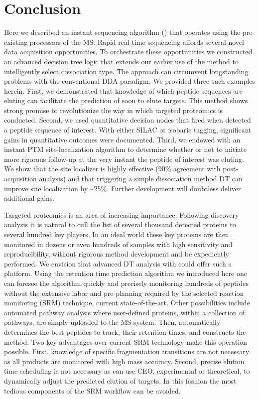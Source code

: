 \section{Conclusion}

Here we described an instant sequencing algorithm (\inseq{}) that operates using the pre-existing processors of the MS. Rapid real-time sequencing affords several novel data acquisition opportunities. To orchestrate these opportunities we constructed an advanced decision tree logic that extends our earlier use of the method to intelligently select dissociation type. The approach can circumvent longstanding problems with the conventional DDA paradigm. We provided three such examples herein. First, we demonstrated that knowledge of which peptide sequences are eluting can facilitate the prediction of soon to elute targets. This method shows strong promise to revolutionize the way in which targeted proteomics is conducted. Second, we used quantitative decision nodes that fired when \inseq{} detected a peptide sequence of interest. With either SILAC or isobaric tagging, significant gains in quantitative outcomes were documented. Third, we endowed \inseq{} with an instant PTM site-localization algorithm to determine whether or not to initiate more rigorous follow-up at the very instant the peptide of interest was eluting. We show that the \inseq{} site localizer is highly effective (90\% agreement with post-acquisition analysis) and that triggering a simple dissociation method DT can improve site localization by \textasciitilde25\%. Further development will doubtless deliver additional gains.

Targeted proteomics is an area of increasing importance. Following discovery analysis it is natural to cull the list of several thousand detected proteins to several hundred key players. In an ideal world these key proteins are then monitored in dozens or even hundreds of samples with high sensitivity and reproducibility, without rigorous method development and be expediently performed. We envision that advanced DT analysis with \inseq{} could offer such a platform. Using the retention time prediction algorithm we introduced here one can foresee the \inseq{} algorithm quickly and precisely monitoring hundreds of peptides without the extensive labor and pre-planning required by the selected reaction monitoring (SRM) technique, current state-of-the-art.\cite{srm} Other possibilities include automated pathway analysis where user-defined proteins, within a collection of pathways, are simply uploaded to the MS system. Then, \inseq{} automatically determines the best peptides to track, their retention times, and constructs the method. Two key advantages over current SRM technology make this operation possible. First, knowledge of specific fragmentation transitions are not necessary as all products are monitored with high mass accuracy. Second, precise elution time scheduling is not necessary as \inseq{} can use CEO, experimental or theoretical, to dynamically adjust the predicted elution of targets. In this fashion the most tedious components of the SRM workflow can be avoided.

